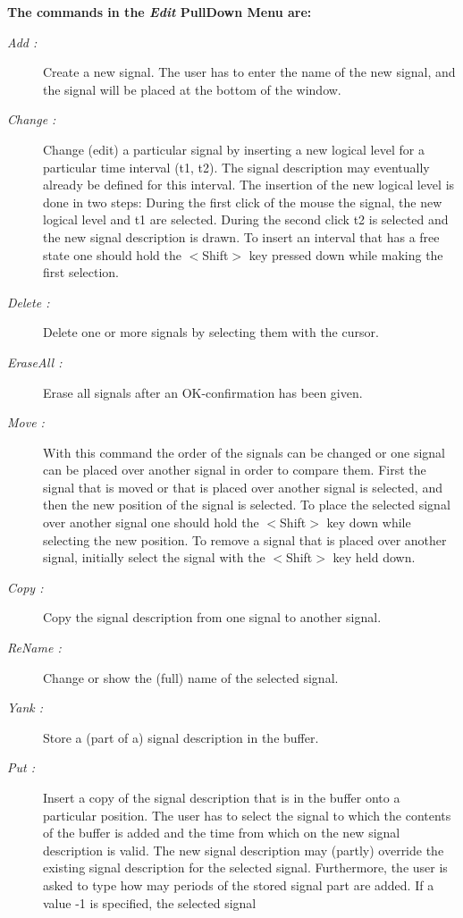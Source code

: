 {\bf The commands in the {\it Edit} PullDown Menu are:}
\begin{description}
\item [{\it Add :}]
Create a new signal. The user has to enter the name of the new
signal, and the signal will be placed at the bottom of
the window.
\item [{\it Change :}]
Change (edit) a particular signal by inserting a new logical level
for a particular time interval (t1, t2).
The signal description may eventually already be defined for this interval.
The insertion of the new logical level is done in two steps:
During the first click of the mouse
the signal, the new logical level and t1 are selected.
During the second click t2 is selected and the new signal
description is drawn.
To insert an interval that has a free state 
one should hold the $<$Shift$>$ key pressed down
while making the first selection.
\item [{\it Delete :}]
Delete one or more signals by selecting them with the cursor.
\item [{\it EraseAll :}]
Erase all signals after an OK-confirmation has been given.
\item [{\it Move :}]
With this command the order of the signals can be changed
or one signal can be placed over another signal
in order to compare them.
First the signal that is moved or that is placed over another signal
is selected,
and then the new position of the signal is selected.
To place the selected signal over another signal one should hold
the $<$Shift$>$ key down while selecting the new position.
To remove a signal that is placed over another signal,
initially select the signal with the $<$Shift$>$ key held down.
\item [{\it Copy :}]
Copy the signal description from one signal to another signal.
\item [{\it ReName :}]
Change or show the (full) name of the selected signal.
\item [{\it Yank :}]
Store a (part of a) signal description in the buffer.
\item [{\it Put :}]
Insert a copy of the signal description that is in the buffer onto
a particular position.
The user has to select the signal to which the contents
of the buffer is added and the time from which on the
new signal description is valid.
The new signal description may (partly) override the existing
signal description for the selected signal.
Furthermore,
the user is asked to type how may periods of the stored signal part
are added.
If a value -1 is specified, the selected signal

\end{description}
